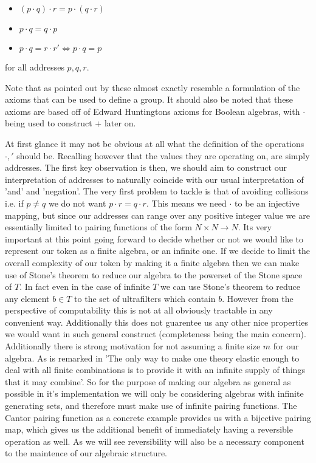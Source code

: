 \documentclass[12pt]{amsart}
\begin{document}
\begin{itemize}
\item $(p \cdot q) \cdot r  = p \cdot (q \cdot r)$
\item $p \cdot q = q\cdot p$
\item $p\cdot q = r\cdot r' \iff p\cdot q = p$
\end{itemize}
for all addresses $p,q,r$.

Note that as pointed out by \cite{Halmos} these almost exactly resemble a formulation of the axioms that can be used to define a group. It should also be noted that these axioms are based off of Edward Huntingtons axioms for Boolean algebras, with $\cdot$ being used to construct $+$ later on.

At first glance it may not be obvious at all what the definition of the operations $\cdot,' $ should be. Recalling however that the values they are operating on, are simply addresses. The first key observation is then, we should aim to construct our interpretation of addresses to naturally coincide with our usual interpretation of 'and' and 'negation'. The very first problem to tackle is that of avoiding collisions i.e. if $p \neq q$ we do not want $p \cdot r = q\cdot r$. This means we need $\cdot$ to be an injective mapping, but since our addresses can range over any positive integer value we are essentially limited to pairing functions of the form $N\times N\rightarrow N$. Its very important at this point going forward to decide whether or not we would like to represent our token as a finite algebra, or an infinite one. If we decide to limit the overall complexity of our token by making it a finite algebra then we can make use of Stone's theorem to reduce our algebra to the powerset of the Stone space of $T$. In fact even in the case of infinite $T$ we can use Stone's theorem to reduce any element $b\in T$ to the set of ultrafilters which contain $b$. However from the perspective of computability this is not at all obviously tractable in any convenient way. Additionally this does not guarentee us any other nice properties we would want in such general construct (completeness being the main concern). Additionally there is strong motivation for not assuming a finite size $m$ for our algebra. As is remarked in \cite{Halmos2} 'The only way to make one theory elastic enough to deal with all finite combinations is to provide it with an infinite supply of things that it may combine'. So for the purpose of making our algebra as general as possible in it's implementation we will only be considering algebras with infinite generating sets, and therefore must make use of infinite pairing functions. The Cantor pairing function as a concrete example provides us with a bijective pairing map, which gives us the additional benefit of immediately having a reversible operation as well. As we will see reversibility will also be a necessary component to the maintence of our algebraic structure.
\end{document}

